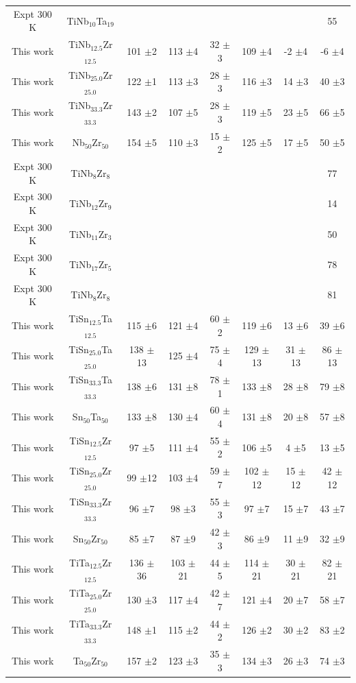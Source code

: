 \begin{longtable}[H]{ c c c c c c c c}
	Expt 300 K \cite{Mohammed2014} & TiNb$_{10}$Ta$_{19}$ & & & & & & 55\\
	This work & TiNb$_{12.5}$Zr$_{12.5}$ & 101 $\pm$2 & 113 $\pm$4 & 32 $\pm$3 & 109 $\pm$4 & -2 $\pm$4 & -6 $\pm$4\\
	This work & TiNb$_{25.0}$Zr$_{25.0}$ & 122 $\pm$1 & 113 $\pm$3 & 28 $\pm$3 & 116 $\pm$3 & 14 $\pm$3 & 40 $\pm$3\\
	This work & TiNb$_{33.3}$Zr$_{33.3}$ & 143 $\pm$2 & 107 $\pm$5 & 28 $\pm$3 & 119 $\pm$5 & 23 $\pm$5 & 66 $\pm$5\\
	This work & Nb$_{50}$Zr$_{50}$ & 154 $\pm$5 & 110 $\pm$3 & 15 $\pm$2 & 125 $\pm$5 & 17 $\pm$5 & 50 $\pm$5\\
	Expt 300 K \cite{Mohammed2014} & TiNb$_{8}$Zr$_{8}$ & & & & & & 77\\
	Expt 300 K \cite{Mohammed2014} & TiNb$_{12}$Zr$_{9}$ & & & & & & 14\\
	Expt 300 K \cite{Mohammed2014} & TiNb$_{11}$Zr$_{3}$ & & & & & & 50\\
	Expt 300 K \cite{Niinomi2012} & TiNb$_{17}$Zr$_{5}$ & & & & & & 78\\
	Expt 300 K \cite{Geetha2009} & TiNb$_{8}$Zr$_{8}$ & & & & & & 81\\
	This work & TiSn$_{12.5}$Ta$_{12.5}$ & 115 $\pm$6 & 121 $\pm$4 & 60 $\pm$2 & 119 $\pm$6 & 13 $\pm$6 & 39 $\pm$6\\
	This work & TiSn$_{25.0}$Ta$_{25.0}$ & 138 $\pm$13 & 125 $\pm$4 & 75 $\pm$4 & 129 $\pm$13 & 31 $\pm$13 & 86 $\pm$13\\
	This work & TiSn$_{33.3}$Ta$_{33.3}$ & 138 $\pm$6 & 131 $\pm$8 & 78 $\pm$1 & 133 $\pm$8 & 28 $\pm$8 & 79 $\pm$8\\
	This work & Sn$_{50}$Ta$_{50}$ & 133 $\pm$8 & 130 $\pm$4 & 60 $\pm$4 & 131 $\pm$8 & 20 $\pm$8 & 57 $\pm$8\\
	This work & TiSn$_{12.5}$Zr$_{12.5}$ & 97 $\pm$5 & 111 $\pm$4 & 55 $\pm$2 & 106 $\pm$5 & 4 $\pm$5 & 13 $\pm$5\\
	This work & TiSn$_{25.0}$Zr$_{25.0}$ & 99 $\pm$12 & 103 $\pm$4 & 59 $\pm$7 & 102 $\pm$12 & 15 $\pm$12 & 42 $\pm$12\\
	This work & TiSn$_{33.3}$Zr$_{33.3}$ & 96 $\pm$7 & 98 $\pm$3 & 55 $\pm$3 & 97 $\pm$7 & 15 $\pm$7 & 43 $\pm$7\\
	This work & Sn$_{50}$Zr$_{50}$ & 85 $\pm$7 & 87 $\pm$9 & 42 $\pm$3 & 86 $\pm$9 & 11 $\pm$9 & 32 $\pm$9\\
	This work & TiTa$_{12.5}$Zr$_{12.5}$ & 136 $\pm$36 & 103 $\pm$21 & 44 $\pm$5 & 114 $\pm$21 & 30 $\pm$21 & 82 $\pm$21\\
	This work & TiTa$_{25.0}$Zr$_{25.0}$ & 130 $\pm$3 & 117 $\pm$4 & 42 $\pm$7 & 121 $\pm$4 & 20 $\pm$7 & 58 $\pm$7\\
	This work & TiTa$_{33.3}$Zr$_{33.3}$ & 148 $\pm$1 & 115 $\pm$2 & 44 $\pm$2 & 126 $\pm$2 & 30 $\pm$2 & 83 $\pm$2\\
	This work & Ta$_{50}$Zr$_{50}$ & 157 $\pm$2 & 123 $\pm$3 & 35 $\pm$3 & 134 $\pm$3 & 26 $\pm$3 & 74 $\pm$3\\
	\hline
\end{longtable}

